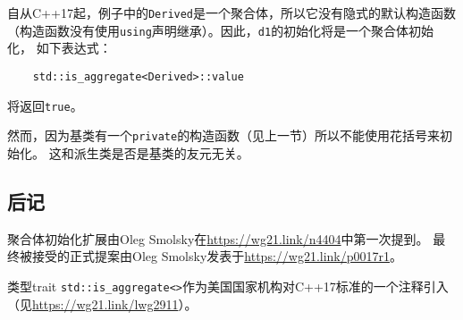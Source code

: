 自从C++17起，例子中的\texttt{Derived}是一个聚合体，所以它没有隐式的默认构造函数
（构造函数没有使用\texttt{using}声明继承）。因此，\texttt{d1}的初始化将是一个聚合体初始化，
如下表达式：
\begin{lstlisting}
    std::is_aggregate<Derived>::value
\end{lstlisting}
将返回\texttt{true}。

然而，因为基类有一个\texttt{private}的构造函数（见上一节）所以不能使用花括号来初始化。
这和派生类是否是基类的友元无关。

\subsection{后记}
聚合体初始化扩展由Oleg Smolsky在\url{https://wg21.link/n4404}中第一次提到。
最终被接受的正式提案由Oleg Smolsky发表于\url{https://wg21.link/p0017r1}。

类型trait \texttt{std::is\_aggregate<>}作为美国国家机构对C++17标准的一个注释引入
（见\url{https://wg21.link/lwg2911}）。
